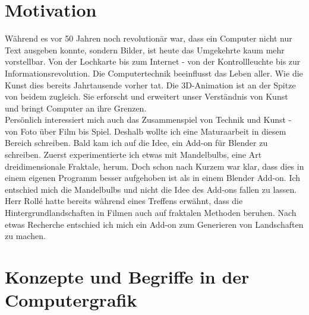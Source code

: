 \documentclass[12pt,twoside]{book}
\begin{document}
\chapter{Motivation}
W\"ahrend es vor 50 Jahren noch revolution\"ar war, dass ein Computer nicht nur Text ausgeben konnte, sondern Bilder, ist heute das Umgekehrte kaum mehr vorstellbar. Von der Lochkarte bis zum Internet - von der Kontrollleuchte bis zur Informationsrevolution. Die Computertechnik beeinflusst das Leben aller. Wie die Kunst dies bereits Jahrtausende vorher tat. Die 3D-Animation ist an der Spitze von beidem zugleich. Sie erforscht und erweitert unser  Verst\"andnis von Kunst und bringt Computer an ihre Grenzen. \\
Pers\"onlich interessiert mich auch das Zusammenspiel von Technik und Kunst - von Foto \"uber Film bis Spiel.
Deshalb wollte ich eine Maturaarbeit in diesem Bereich schreiben.
Bald kam ich auf die Idee, ein Add-on f\"ur Blender zu schreiben. Zuerst experimentierte ich etwas mit Mandelbulbs, eine Art dreidimensionale Fraktale, herum.
Doch schon nach Kurzem war klar, dass dies in einem eigenen Programm besser aufgehoben ist als in einem Blender Add-on.
Ich entschied mich die Mandelbulbs und nicht die Idee des Add-ons fallen zu lassen. 
Herr Rollé hatte bereits w\"ahrend eines Treffens erw\"ahnt, dass die Hintergrundlandschaften in Filmen auch auf fraktalen Methoden beruhen.
Nach etwas Recherche entschied ich mich ein Add-on zum Generieren von Landschaften zu machen.


\chapter{Konzepte und Begriffe in der Computergrafik}
\end{document}
